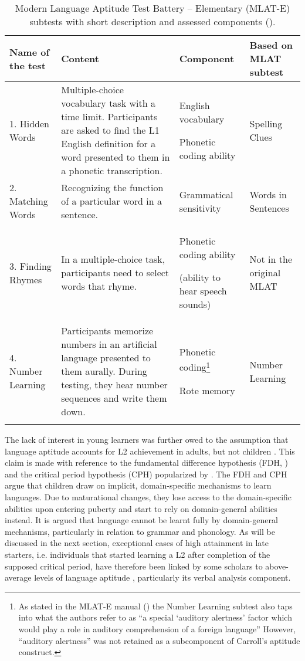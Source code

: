 \documentclass[output=paper]{langscibook}
\begin{document}
\begin{sidewaystable}
\caption{Modern Language Aptitude Test Battery – Elementary (MLAT-E) subtests with short description and assessed components (\citealt{CarrollSapon1976}).\label{tab:01:2}}
\begin{tabularx}{\textwidth}{lQQl}
\lsptoprule
{Name of the test} & {Content} & {Component} & {Based on MLAT subtest}\\\midrule
{1. Hidden Words} & {Multiple-choice vocabulary task with a time limit. Participants are asked to find the L1 English definition for a word presented to them in a phonetic transcription.} & {English vocabulary} 

{Phonetic coding ability} & {Spelling Clues}\\
{2. Matching Words}  & {Recognizing the function of a particular word in a sentence.} & {Grammatical sensitivity} & {Words in Sentences}\\
{3. Finding Rhymes} & {In a multiple-choice task, participants need to select words that rhyme.} & {Phonetic coding ability}

{(ability to hear speech sounds)} & {Not in the original MLAT}\\
{4. Number Learning} & {Participants memorize numbers in an artificial language presented to them aurally. During testing, they hear number sequences and write them down.} & Phonetic coding\footnote{As stated in the MLAT-E manual (\citealt[2]{CarrollSapon1976}) the Number Learning subtest also taps into what the authors refer to as “a special `auditory alertness' factor which would play a role in auditory comprehension of a foreign language” However, “auditory alertness” was not retained as a subcomponent of Carroll’s aptitude construct.}

{Rote memory} & {Number Learning}\\
\lspbottomrule
\end{tabularx}
\end{sidewaystable}

The lack of interest in young learners was further owed to the assumption that language aptitude accounts for L2 achievement in adults, but not children \citep{Li2018}. This claim is made with reference to the fundamental difference hypothesis (FDH, \citealt{BleyVroman1989}) and the critical period hypothesis (CPH) popularized by \citet{Lenneberg1967}. The FDH and CPH argue that children draw on implicit, domain-specific mechanisms to learn languages. Due to maturational changes, they lose access to the domain-specific abilities upon entering puberty and start to rely on domain-general abilities instead. It is argued that language cannot be learnt fully by domain-general mechanisms, particularly in relation to grammar and phonology. As will be discussed in the next section, exceptional cases of high attainment in late starters, i.e. individuals that started learning a L2 after completion of the supposed critical period, have therefore been linked by some scholars to above-average levels of language aptitude \citep{DeKeyser2000}, particularly its verbal analysis component.
\end{document}
